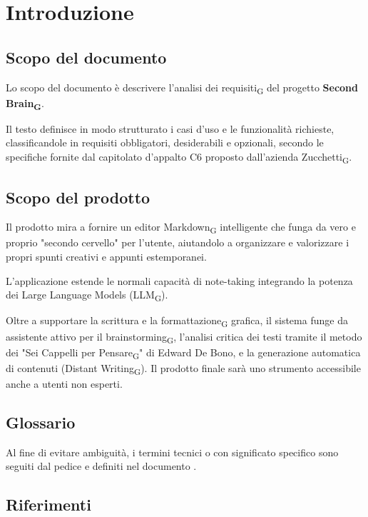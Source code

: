 \section{Introduzione}

\subsection{Scopo del documento}
Lo scopo del documento è descrivere l'analisi dei requisiti\textsubscript{G} del progetto \textbf{Second Brain\textsubscript{G}}. 

Il testo definisce in modo strutturato i casi d’uso e le funzionalità richieste, classificandole in requisiti obbligatori, desiderabili e opzionali, secondo le specifiche fornite dal capitolato d'appalto C6 proposto dall'azienda Zucchetti\textsubscript{G}.

\subsection{Scopo del prodotto}
Il prodotto mira a fornire un editor Markdown\textsubscript{G} intelligente che funga da vero e proprio "secondo cervello" per l'utente, aiutandolo a organizzare e valorizzare i propri spunti creativi e appunti estemporanei. 

L'applicazione estende le normali capacità di note-taking integrando la potenza dei Large Language Models (LLM\textsubscript{G}). 

Oltre a supportare la scrittura e la formattazione\textsubscript{G} grafica, il sistema funge da assistente attivo per il brainstorming\textsubscript{G}, l'analisi critica dei testi tramite il metodo dei "Sei Cappelli per Pensare\textsubscript{G}" di Edward De Bono, e la generazione automatica di contenuti (Distant Writing\textsubscript{G}). 
Il prodotto finale sarà uno strumento accessibile anche a utenti non esperti.

\subsection{Glossario}
Al fine di evitare ambiguità, i termini tecnici o con significato specifico sono seguiti dal pedice e definiti nel documento .

\subsection{Riferimenti}

